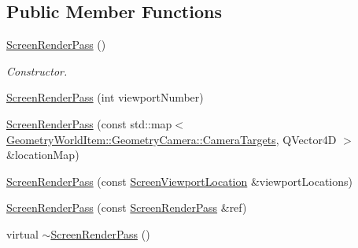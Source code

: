 \subsection*{Public Member Functions}
\begin{DoxyCompactItemize}
\item 
\mbox{\label{class_geometry_engine_1_1_geometry_render_step_1_1_screen_render_pass_adefe38ec8745b27895a49c043f7c4b12}} 
\mbox{\hyperlink{class_geometry_engine_1_1_geometry_render_step_1_1_screen_render_pass_adefe38ec8745b27895a49c043f7c4b12}{Screen\+Render\+Pass}} ()
\begin{DoxyCompactList}\small\item\em Constructor. \end{DoxyCompactList}\item 
\mbox{\hyperlink{class_geometry_engine_1_1_geometry_render_step_1_1_screen_render_pass_a882789c96dff7b4ec4c7bbef282e7da0}{Screen\+Render\+Pass}} (int viewport\+Number)
\item 
\mbox{\hyperlink{class_geometry_engine_1_1_geometry_render_step_1_1_screen_render_pass_a7625bb8335105763f0cec256f42f4f5d}{Screen\+Render\+Pass}} (const std\+::map$<$ \mbox{\hyperlink{namespace_geometry_engine_1_1_geometry_world_item_1_1_geometry_camera_a3766848bae97ff8203fa26907ac359ef}{Geometry\+World\+Item\+::\+Geometry\+Camera\+::\+Camera\+Targets}}, Q\+Vector4D $>$ \&location\+Map)
\item 
\mbox{\hyperlink{class_geometry_engine_1_1_geometry_render_step_1_1_screen_render_pass_a40e341e548585d5068ca5eed0735f55a}{Screen\+Render\+Pass}} (const \mbox{\hyperlink{class_geometry_engine_1_1_geometry_render_step_1_1_screen_viewport_location}{Screen\+Viewport\+Location}} \&viewport\+Locations)
\item 
\mbox{\hyperlink{class_geometry_engine_1_1_geometry_render_step_1_1_screen_render_pass_a9801a2d9e02c1b19816836c1348ddd4b}{Screen\+Render\+Pass}} (const \mbox{\hyperlink{class_geometry_engine_1_1_geometry_render_step_1_1_screen_render_pass}{Screen\+Render\+Pass}} \&ref)
\item 
\mbox{\label{class_geometry_engine_1_1_geometry_render_step_1_1_screen_render_pass_a28917fa043e46ff21802488269304c9f}} 
virtual \mbox{\hyperlink{class_geometry_engine_1_1_geometry_render_step_1_1_screen_render_pass_a28917fa043e46ff21802488269304c9f}{$\sim$\+Screen\+Render\+Pass}} ()

\end{DoxyCompactItemize}
